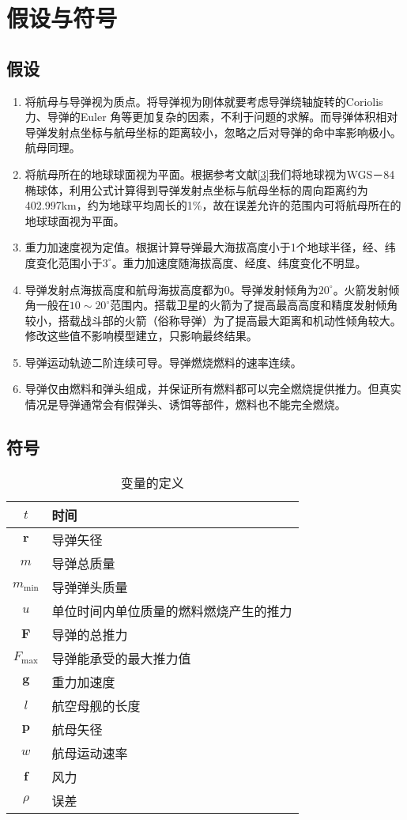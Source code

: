 \documentclass[UTF8]{article}
\begin{document}
\section{假设与符号}
\subsection{假设}
\begin{enumerate}[1]
\item 将航母与导弹视为质点。将导弹视为刚体就要考虑导弹绕轴旋转的Coriolis 力、导弹的Euler 角等更加复杂的因素，不利于问题的求解。而导弹体积相对导弹发射点坐标与航母坐标的距离较小，忽略之后对导弹的命中率影响极小。航母同理。
\item 将航母所在的地球球面视为平面。根据参考文献\ref{3}我们将地球视为WGS－84椭球体，利用公式计算得到导弹发射点坐标与航母坐标的周向距离约为402.997km，约为地球平均周长的1\%，故在误差允许的范围内可将航母所在的地球球面视为平面。
\item 重力加速度视为定值。根据计算导弹最大海拔高度小于1个地球半径，经、纬度变化范围小于\(3^\circ\)。重力加速度随海拔高度、经度、纬度变化不明显。
\item 导弹发射点海拔高度和航母海拔高度都为0。导弹发射倾角为\(20^\circ\)。火箭发射倾角一般在\(10\sim20^\circ\)范围内。搭载卫星的火箭为了提高最高高度和精度发射倾角较小，搭载战斗部的火箭（俗称导弹）为了提高最大距离和机动性倾角较大。修改这些值不影响模型建立，只影响最终结果。
\item 导弹运动轨迹二阶连续可导。导弹燃烧燃料的速率连续。
\item 导弹仅由燃料和弹头组成，并保证所有燃料都可以完全燃烧提供推力。但真实情况是导弹通常会有假弹头、诱饵等部件，燃料也不能完全燃烧。
\end{enumerate}
\subsection{符号}
\begin{table}[htbp]
\centering
\caption{变量的定义}
\begin{tabular}{|c|l|}
\hline
\(t\)&时间\\
\hline
\(\textbf{r}\)&导弹矢径\\
\hline
\(m\)&导弹总质量\\
\hline
\(m_\textrm{min}\)&导弹弹头质量\\
\hline
\(u\)&单位时间内单位质量的燃料燃烧产生的推力\\
\hline
\(\textbf{F}\)&导弹的总推力\\
\hline
\(F_\textrm{max}\)&导弹能承受的最大推力值\\
\hline
\(\textbf{g}\)&重力加速度\\
\hline
\(l\)&航空母舰的长度\\
\hline
\(\textbf{p}\)&航母矢径\\
\hline
\(w\)&航母运动速率\\
\hline
\(\textbf{f}\)&风力\\
\hline
\(\rho\)&误差\\
\hline
\end{tabular}
\end{table}
\end{document}
